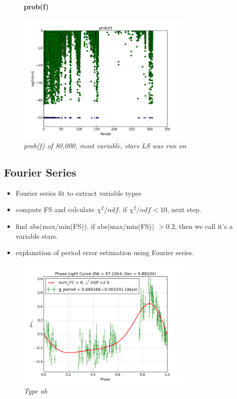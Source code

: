 \documentclass[aps,prb,twocolumn,superscriptaddress]{revtex4-1}
\begin{document}
\begin{figure}[H]
 \centering
 \textbf{prob(f)}\par\medskip
 	\includegraphics[width=3.35in]{figures/log_period_diff-50.png}
 \caption{\it \small{prob(f) of 80,000, most variable, stars LS was run on}}
 \label{fig:quartpy}
\end{figure}


\subsection{Fourier Series}

\begin{itemize}
	\item{} Fourier series fit to extract variable types
\end{itemize}

\begin{itemize}
	\item{} compute FS and calculate $\chi^2 / ndf$. if $\chi^2 / ndf < 10$, next step.
	\item{} find abs(max/min(FS)). if abs(max/min(FS)) $> 0.2$, then we call it's a variable stars.
	\item{} explanation of period error estimation using Fourier series.
	\end{itemize}

	\begin{figure}[!]
	 \centering
	 	\includegraphics[width=3.35in]{figures/FSP1_g_LC_rrrtest_p5_grp19.png}
	 \caption{\it \small{Type ab}}
	 \label{fig:Typeab}
	\end{figure}
\end{document}
